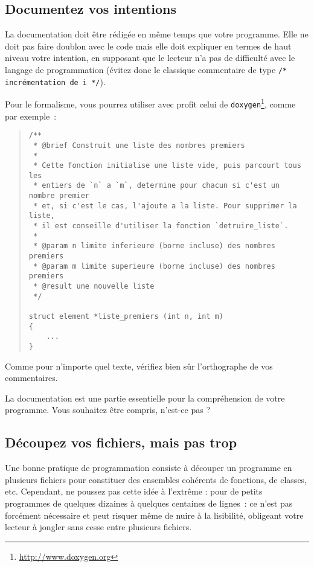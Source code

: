 \documentclass {article}
\begin{document}
\subsection {Documentez vos intentions}

La documentation doit être rédigée en même temps que votre programme.
Elle ne doit pas faire doublon avec le code mais elle doit expliquer
en termes de haut niveau votre intention, en supposant que le lecteur
n'a pas de difficulté avec le langage de programmation (évitez donc
le classique commentaire de type \verb|/* incrémentation de i */|).

Pour le formalisme, vous pourrez utiliser avec profit celui de \texttt
{doxygen}\footnote {\url {http://www.doxygen.org}}, comme par exemple~:

\begin {quote}
\begin {lstlisting}
/**
 * @brief Construit une liste des nombres premiers
 *
 * Cette fonction initialise une liste vide, puis parcourt tous les
 * entiers de `n` a `m`, determine pour chacun si c'est un nombre premier
 * et, si c'est le cas, l'ajoute a la liste. Pour supprimer la liste,
 * il est conseille d'utiliser la fonction `detruire_liste`.
 *
 * @param n limite inferieure (borne incluse) des nombres premiers
 * @param m limite superieure (borne incluse) des nombres premiers
 * @result une nouvelle liste
 */

struct element *liste_premiers (int n, int m)
{
    ...
}
\end{lstlisting}
\end {quote}

Comme pour n'importe quel texte, vérifiez bien sûr l'orthographe de
vos commentaires.

La documentation est une partie essentielle pour la compréhension de
votre programme. Vous souhaitez être compris, n'est-ce pas ?


\subsection {Découpez vos fichiers, mais pas trop}

Une bonne pratique de programmation consiste à découper un programme en
plusieurs fichiers pour constituer des ensembles cohérents de fonctions,
de classes, etc. Cependant, ne poussez pas cette idée à l'extrême :
pour de petits programmes de quelques dizaines à quelques centaines de
lignes~: ce n'est pas forcément nécessaire et peut risquer même de
nuire à la lisibilité, obligeant votre lecteur à jongler sans cesse
entre plusieurs fichiers.
\end{document}
